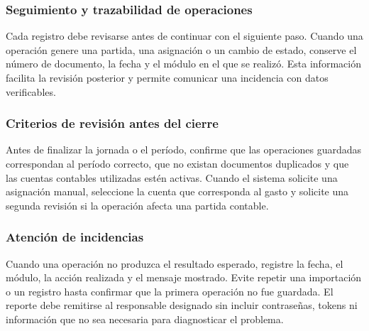 \subsubsection{Seguimiento y trazabilidad de operaciones}
Cada registro debe revisarse antes de continuar con el siguiente paso. Cuando una operación genere una partida, una asignación o un cambio de estado, conserve el número de documento, la fecha y el módulo en el que se realizó. Esta información facilita la revisión posterior y permite comunicar una incidencia con datos verificables.

\subsubsection{Criterios de revisión antes del cierre}
Antes de finalizar la jornada o el período, confirme que las operaciones guardadas correspondan al período correcto, que no existan documentos duplicados y que las cuentas contables utilizadas estén activas. Cuando el sistema solicite una asignación manual, seleccione la cuenta que corresponda al gasto y solicite una segunda revisión si la operación afecta una partida contable.

\subsubsection{Atención de incidencias}
Cuando una operación no produzca el resultado esperado, registre la fecha, el módulo, la acción realizada y el mensaje mostrado. Evite repetir una importación o un registro hasta confirmar que la primera operación no fue guardada. El reporte debe remitirse al responsable designado sin incluir contraseñas, tokens ni información que no sea necesaria para diagnosticar el problema.